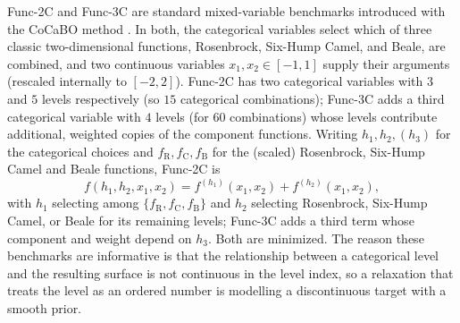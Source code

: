Func-2C and Func-3C are standard mixed-variable benchmarks introduced with the CoCaBO method \cite{ru2020cocabo}. In both, the categorical variables select which of three classic two-dimensional functions, Rosenbrock, Six-Hump Camel, and Beale, are combined, and two continuous variables $x_1,x_2 \in [-1,1]$ supply their arguments (rescaled internally to $[-2,2]$). Func-2C has two categorical variables with $3$ and $5$ levels respectively (so $15$ categorical combinations); Func-3C adds a third categorical variable with $4$ levels (for $60$ combinations) whose levels contribute additional, weighted copies of the component functions. Writing $h_1,h_2,(h_3)$ for the categorical choices and $f_{\text{R}},f_{\text{C}},f_{\text{B}}$ for the (scaled) Rosenbrock, Six-Hump Camel and Beale functions, Func-2C is
\[ f(h_1,h_2,x_1,x_2) = f^{(h_1)}(x_1,x_2) + f^{(h_2)}(x_1,x_2), \]
with $h_1$ selecting among $\{f_{\text{R}},f_{\text{C}},f_{\text{B}}\}$ and $h_2$ selecting Rosenbrock, Six-Hump Camel, or Beale for its remaining levels; Func-3C adds a third term whose component and weight depend on $h_3$. Both are minimized. The reason these benchmarks are informative is that the relationship between a categorical level and the resulting surface is not continuous in the level index, so a relaxation that treats the level as an ordered number is modelling a discontinuous target with a smooth prior.


